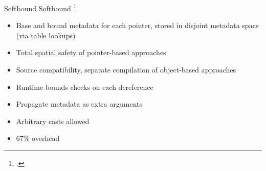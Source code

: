\documentclass[aspectratio=169]{beamer}
\begin{document}
\begin{frame}{Softbound}
\footnotesize
Softbound \footcite{nagarakatte_softbound:_2009}
    \begin{itemize}[<+->]
        \item Base and bound metadata for each pointer, stored in disjoint metadata space (via table lookups) 
        \item Total spatial safety of pointer-based approaches 
        \item Source compatibility, separate compilation of object-based approaches
        \item Runtime bounds checks on each dereference
        \item Propagate metadata as extra arguments 
        \item Arbitrary casts allowed 
        \item 67\% overhead
    \end{itemize}
\end{frame}


\end{document}
